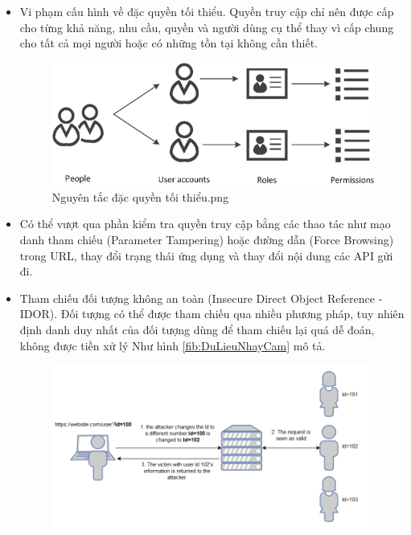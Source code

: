 \begin{itemize}
    \item Vi phạm cấu hình về đặc quyền tối thiểu. Quyền truy cập chỉ nên được cấp cho từng khả năng, nhu cầu, quyền và người dùng cụ thể thay vì cấp chung cho tất cả mọi người hoặc có những tồn tại không cần thiết.
    \begin{figure}[H]
        \centering
        \includegraphics[width=\textwidth]{applied-thesis-chapters/chapter-2/Nguyên tắc đặc quyền tối thiểu.png}
        \caption{Nguyên tắc đặc quyền tối thiểu.png ~\cite{chap2bib2}}
    \end{figure}
    \item Có thể vượt qua phần kiểm tra quyền truy cập bằng các thao tác như mạo danh tham chiếu (Parameter Tampering) hoặc đường dẫn (Force Browsing) trong URL, thay đổi trạng thái ứng dụng và thay đổi nội dung các API gửi đi.
    \item Tham chiếu đối tượng không an toàn (Insecure Direct Object Reference - IDOR). Đối tượng có thể được tham chiếu qua nhiều phương pháp, tuy nhiên định danh duy nhất của đối tượng dùng để tham chiếu lại quá dễ đoán, không được tiền xử lý
    Như hình \ref{fib:DuLieuNhayCam} mô tả.
    \begin{figure}[H]
        \centering
        \includegraphics[width=\textwidth]{applied-thesis-chapters/chapter-2/Mô tả dữ liệu nhạy cảm có thể được tìm thấy trong URL.png}

\end{figure}
\end{itemize}
